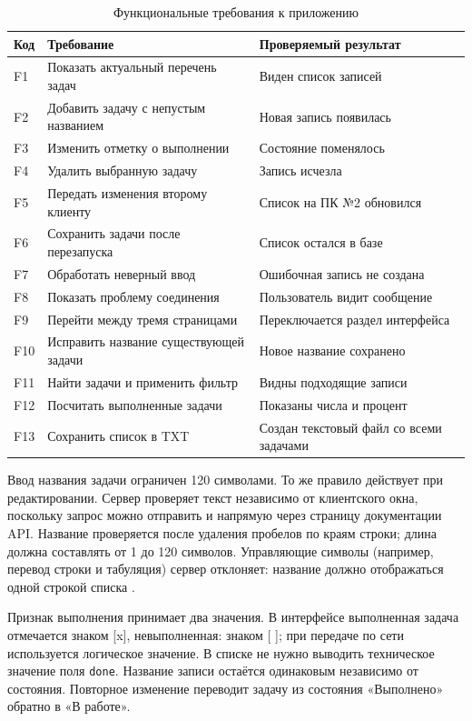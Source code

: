 \begin{table}[H]
\caption{Функциональные требования к приложению}
\label{tab:req-functional}
\small\centering\renewcommand{\arraystretch}{1.25}
\begin{tabularx}{\textwidth}{|L{13mm}|Y|L{33mm}|}
\hline
Код & Требование & Проверяемый результат \\
\hline
F1 & Показать актуальный перечень задач & Виден список записей \\
\hline
F2 & Добавить задачу с непустым названием & Новая запись появилась \\
\hline
F3 & Изменить отметку о выполнении & Состояние поменялось \\
\hline
F4 & Удалить выбранную задачу & Запись исчезла \\
\hline
F5 & Передать изменения второму клиенту & Список на ПК №2 обновился \\
\hline
F6 & Сохранить задачи после перезапуска & Список остался в базе \\
\hline
F7 & Обработать неверный ввод & Ошибочная запись не создана \\
\hline
F8 & Показать проблему соединения & Пользователь видит сообщение \\
\hline
F9 & Перейти между тремя страницами & Переключается раздел интерфейса \\
\hline
F10 & Исправить название существующей задачи & Новое название сохранено \\
\hline
F11 & Найти задачи и применить фильтр & Видны подходящие записи \\
\hline
F12 & Посчитать выполненные задачи & Показаны числа и процент \\
\hline
F13 & Сохранить список в TXT & Создан текстовый файл со всеми задачами \\
\hline
\end{tabularx}
\end{table}

Ввод названия задачи ограничен 120 символами. То же правило действует при редактировании. Сервер проверяет текст независимо от клиентского окна, поскольку запрос можно отправить и напрямую через страницу документации API. Название проверяется после удаления пробелов по краям строки; длина должна составлять от 1 до 120 символов. Управляющие символы (например, перевод строки и табуляция) сервер отклоняет: название должно отображаться одной строкой списка \cite{owaspvalidation}.

Признак выполнения принимает два значения. В интерфейсе выполненная задача отмечается знаком [x], невыполненная: знаком [ ]; при передаче по сети используется логическое значение. В списке не нужно выводить техническое значение поля \texttt{done}. Название записи остаётся одинаковым независимо от состояния. Повторное изменение переводит задачу из состояния «Выполнено» обратно в «В работе».

